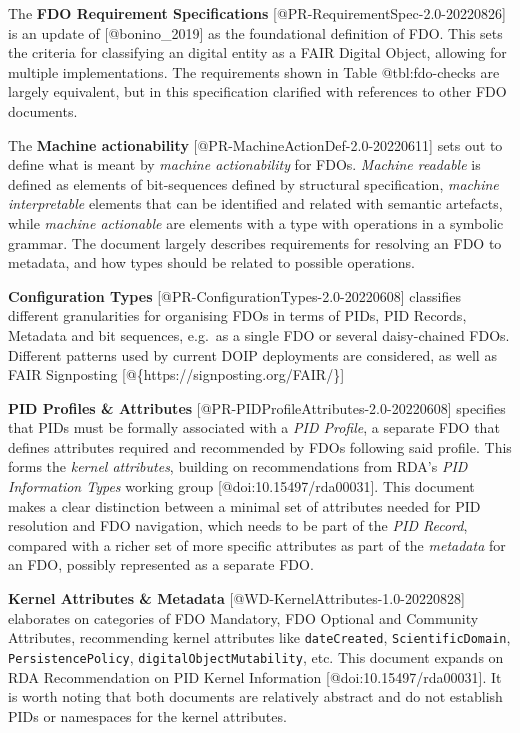 The \textbf{FDO Requirement Specifications}
{[}@PR-RequirementSpec-2.0-20220826{]} is an update of
{[}@bonino\_2019{]} as the foundational definition of FDO. This sets the
criteria for classifying an digital entity as a FAIR Digital Object,
allowing for multiple implementations. The requirements shown in Table
@tbl:fdo-checks are largely equivalent, but in this specification
clarified with references to other FDO documents.

The \textbf{Machine actionability}
{[}@PR-MachineActionDef-2.0-20220611{]} sets out to define what is meant
by \emph{machine actionability} for FDOs. \emph{Machine readable} is
defined as elements of bit-sequences defined by structural
specification, \emph{machine interpretable} elements that can be
identified and related with semantic artefacts, while \emph{machine
actionable} are elements with a type with operations in a symbolic
grammar. The document largely describes requirements for resolving an
FDO to metadata, and how types should be related to possible operations.

\textbf{Configuration Types} {[}@PR-ConfigurationTypes-2.0-20220608{]}
classifies different granularities for organising FDOs in terms of PIDs,
PID Records, Metadata and bit sequences, e.g.~as a single FDO or several
daisy-chained FDOs. Different patterns used by current DOIP deployments
are considered, as well as FAIR Signposting
{[}@\{https://signposting.org/FAIR/\}{]}

\textbf{PID Profiles \& Attributes}
{[}@PR-PIDProfileAttributes-2.0-20220608{]} specifies that PIDs must be
formally associated with a \emph{PID Profile}, a separate FDO that
defines attributes required and recommended by FDOs following said
profile. This forms the \emph{kernel attributes}, building on
recommendations from RDA's \emph{PID Information Types} working group
{[}@doi:10.15497/rda00031{]}. This document makes a clear distinction
between a minimal set of attributes needed for PID resolution and FDO
navigation, which needs to be part of the \emph{PID Record}, compared
with a richer set of more specific attributes as part of the
\emph{metadata} for an FDO, possibly represented as a separate FDO.

\textbf{Kernel Attributes \& Metadata}
{[}@WD-KernelAttributes-1.0-20220828{]} elaborates on categories of FDO
Mandatory, FDO Optional and Community Attributes, recommending kernel
attributes like \texttt{dateCreated}, \texttt{ScientificDomain},
\texttt{PersistencePolicy}, \texttt{digitalObjectMutability}, etc. This
document expands on RDA Recommendation on PID Kernel Information
{[}@doi:10.15497/rda00031{]}. It is worth noting that both documents are
relatively abstract and do not establish PIDs or namespaces for the
kernel attributes.

